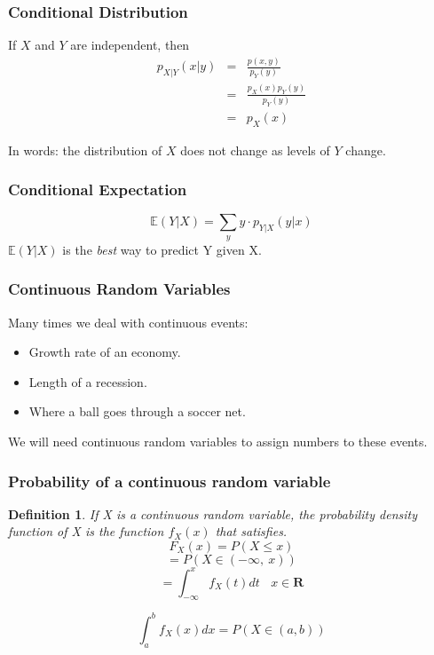 \documentclass[handout]{beamer}
\newtheorem{defn}{Definition}
\numberwithin{equation}{section}
\begin{document}
\begin{frame}
\frametitle{Conditional Distribution}

If $X$ and $Y$ are independent, then 
\begin{eqnarray}
p_{X|Y} (x|y) & = & \frac{p(x,y)}{p_{Y}(y)} \nonumber \\
& = & \frac{p_{X}(x)p_{Y}(y)}{p_{Y}(y) }\nonumber \\
& = & p_{X}(x) \nonumber 
\end{eqnarray}

In words: the distribution of $X$ does not change as levels of $Y$ change.  

\end{frame}

\begin{frame}
\frametitle{Conditional Expectation}
$$\mathbb{E}(Y|X)=\sum_y y\cdot p_{Y|X} (y|x) $$
$\mathbb{E}(Y|X)$ is the \emph{best} way to predict Y given X.

\end{frame}









\begin{frame}
\frametitle{Continuous Random Variables}
Many times we deal with continuous events:
\begin{itemize}
\item Growth rate of an economy.\pause
\item Length of a recession.\pause
\item Where a ball goes through a soccer net.
\end{itemize}
\pause
We will need continuous random variables to assign numbers to these events.
\end{frame}




\begin{frame}
\frametitle{Probability of a continuous random variable}

\begin{defn}
If X is a continuous random variable, the probability density function of X is the function $f_X(x)$ that satisfies.
$$F_X(x)=P(X\leq x)$$\pause
$$=P(X\in (-\infty,\ x))$$
$$=\int_{-\infty}^{x} f_X(t)dt\ \ \ \ x\in \textbf{R}$$
\end{defn}
\pause
$$\int_a^b f_X(x)dx=P(X\in(a,b))$$
\end{frame}
\end{document}
